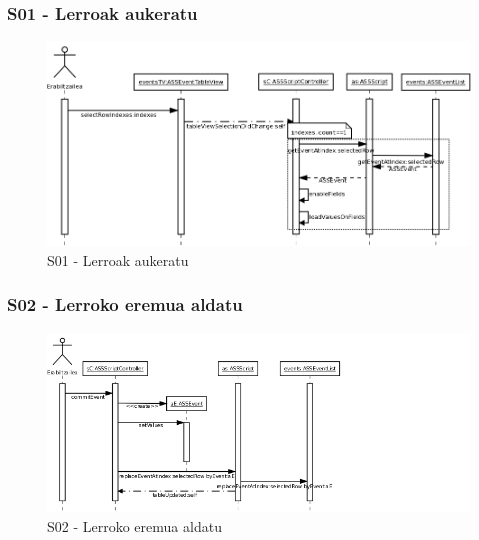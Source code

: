 \subsubsection{S01 - Lerroak aukeratu}
\begin{figure}[htp]
\begin{center}
\includegraphics[scale=0.3]{Pictures/Chapter4/Diseinua/S01.png}
\caption{S01 - Lerroak aukeratu}
\label{s01d}
\end{center}
\end{figure}

\newpage
\subsubsection{S02 - Lerroko eremua aldatu}
\begin{figure}[htp]
\begin{center}
\includegraphics[scale=0.6]{Pictures/Chapter4/Diseinua/S02.png}
\caption{S02 - Lerroko eremua aldatu}
\label{s02d}
\end{center}
\end{figure}


